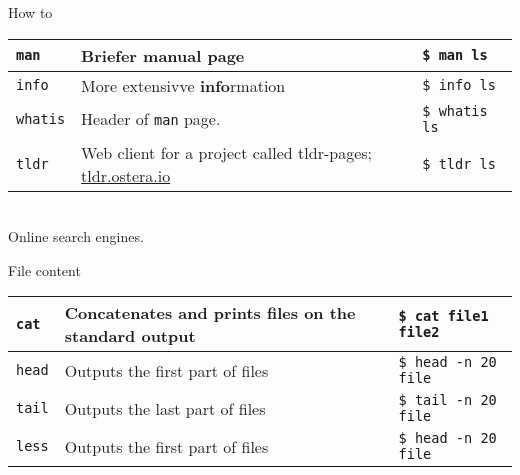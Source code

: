 \documentclass{beamer}
\let\tt\texttt
\let\bf\textbf
\begin{document}
\begin{frame}{How to}
        \begin{tabular}{p{} p{} p{}}
                \hline
                \tt{man}                    &
                Briefer \bf{man}ual page    &
                \tt{\$ man ls}              \\
                \hline
                \tt{info}                           &
                More extensivve \bf{info}rmation    &
                \tt{\$ info ls}                     \\
                \hline
                \tt{whatis}                         &
                Header of \tt{man} page.            &
                \tt{\$ whatis ls}                   \\
                \hline
                \tt{tldr}             &
                Web client for a project called tldr-pages; 
                \url{tldr.ostera.io} &
                \tt{\$ tldr ls}       \\
                \hline
        \end{tabular}   \\
        Online search engines.
\end{frame}

\begin{frame}{File content}
        \begin{tabular}{p{} p{} p{}}
                \hline
                \tt{cat}             &
                Concatenates and prints files on the standard output &
                \tt{\$ cat file1 file2}       \\
                \hline
                \tt{head}             &
                Outputs the first part of files &
                \tt{\$ head -n 20 file}       \\
                \hline
                \tt{tail}             &
                Outputs the last part of files &
                \tt{\$ tail -n 20 file}       \\
                \hline
                \tt{less}             &
                Outputs the first part of files &
                \tt{\$ head -n 20 file}       \\
                \hline
        \end{tabular}  
\end{frame}
\end{document}
